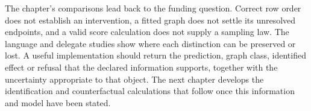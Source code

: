 The chapter's comparisons lead back to the funding question. Correct row
order does not establish an intervention, a fitted graph does not settle
its unresolved endpoints, and a valid score calculation does not supply a
sampling law. The language and delegate studies show where each distinction
can be preserved or lost. A useful implementation should return the
prediction, graph class, identified effect or refusal that the declared
information supports, together with the uncertainty appropriate to that
object. The next chapter develops the identification and counterfactual
calculations that follow once this information and model have been stated.
